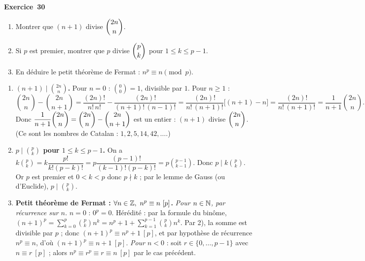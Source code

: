 \documentclass[11pt,a4paper]{article}
\begin{document}
	\medskip\noindent\textbf{\Large\color{bleu}Exercice~30}\nopagebreak
	\begin{enonce}
		\begin{enumerate}
			\item Montrer que $(n+1)$ divise $\dbinom{2n}{n}$.
			\item Si $p$ est premier, montrer que $p$ divise $\dbinom{p}{k}$ pour $1\leq k\leq p-1$.
			\item En déduire le petit théorème de Fermat : $n^p\equiv n\pmod{p}$.
		\end{enumerate}
	\end{enonce}
	\begin{corrige}
		\begin{enumerate}
			\item \textbf{$(n+1)\mid\binom{2n}n$.} Pour $n=0$ : $\binom00=1$, divisible par $1$. Pour $n\geq1$ :
			$$\binom{2n}n-\binom{2n}{n+1}=\frac{(2n)!}{n!\,n!}-\frac{(2n)!}{(n+1)!\,(n-1)!}=\frac{(2n)!}{n!\,(n+1)!}\bigl[(n+1)-n\bigr]=\frac{(2n)!}{n!\,(n+1)!}=\frac1{n+1}\binom{2n}n.$$
			Donc $\dfrac1{n+1}\dbinom{2n}n=\dbinom{2n}n-\dbinom{2n}{n+1}$ est un entier : $(n+1)$ divise $\dbinom{2n}n$. (Ce sont les nombres de Catalan : $1,2,5,14,42,\dots$.)
			\item \textbf{$p\mid\binom pk$ pour $1\leq k\leq p-1$.} On a $k\binom pk=k\dfrac{p!}{k!(p-k)!}=p\dfrac{(p-1)!}{(k-1)!(p-k)!}=p\binom{p-1}{k-1}$. Donc $p\mid k\binom pk$. Or $p$ est premier et $0<k<p$ donc $p\nmid k$ ; par le lemme de Gauss (ou d'Euclide), $p\mid\binom pk$.
			\item \textbf{Petit théorème de Fermat : $\forall n\in\mathbb{Z},\ n^p\equiv n\ [p]$.} \emph{Pour $n\in\mathbb{N}$, par récurrence sur $n$.} $n=0$ : $0^p=0$. Hérédité : par la formule du binôme, $(n+1)^p=\sum_{k=0}^p\binom pkn^k=n^p+1+\sum_{k=1}^{p-1}\binom pkn^k$. Par 2), la somme est divisible par $p$ ; donc $(n+1)^p\equiv n^p+1\ [p]$, et par hypothèse de récurrence $n^p\equiv n$, d'où $(n+1)^p\equiv n+1\ [p]$. \emph{Pour $n<0$} : soit $r\in\{0,\dots,p-1\}$ avec $n\equiv r\ [p]$ ; alors $n^p\equiv r^p\equiv r\equiv n\ [p]$ par le cas précédent.
		\end{enumerate}
	\end{corrige}
	
\end{document}
